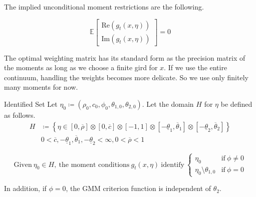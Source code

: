 \documentclass[11pt]{article}
\newcommand*{\E}{\mathbb{E}}
\newcommand*{\Eta}{H}
\begin{document}
The implied unconditional moment restrictions are the following.  

\begin{equation}
    \E \begin{bmatrix}  \mathrm{Re} (g_t(x, \eta)) \\ \mathrm{Im} (g_t(x, \eta)) \end{bmatrix} = 0
\end{equation}


The optimal weighting matrix has its standard form as the precision matrix of the moments as long as we choose a
finite gird for $x$. 
If we use the entire continuum, handling the weights becomes more delicate. 
So we use only finitely many moments for now.



\begin{lemma}{Identified Set}
    \label{lemma:identified_set}
    Let $\eta_0 \coloneqq \left(\rho_0, c_0, \phi_0, \theta_{1,0}, \theta_{2,0}\right)$.
    Let the domain $\Eta$ for $\eta$ be defined as follows. 
    \begin{equation}
    \begin{split}
        \Eta &\coloneqq \left\{ \eta \in  [0, \overline{\rho}] \otimes [0, \overline{c}] \otimes \left[-1,
            1\right] \otimes \left[-\underline{\theta}_1, \overline{\theta}_1\right] \otimes
            \left[-\underline{\theta}_2, \overline{\theta}_2\right]\right\} \\
        &0 < \overline{c}, -\underline{\theta}_1, \overline{\theta}_1, -\underline{\theta}_2 < \infty, 0 <
            \overline{\rho} < 1
    \end{split}
    \end{equation}


    \begin{equation}
        \text{Given}\ \eta_0 \in \Eta,\ \text{the moment conditions}\ g_t(x, \eta)\ \text{identify}\
    \begin{cases}
        \eta_0                          &\text{if}\ \phi \neq 0 \\
        \eta_0 \setminus \theta_{1,0}   &\text{if}\ \phi = 0
    \end{cases}
    \end{equation}

    In addition, if $\phi = 0$, the GMM criterion function is independent of $\theta_2$.
\end{lemma}
\end{document}
